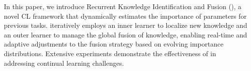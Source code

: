 


In this paper, we introduce Recurrent Knowledge Identification and Fusion ({\ouralg}), a novel CL framework that dynamically estimates the importance of parameters for previous tasks. {\ouralg} iteratively employs an inner learner to localize new knowledge and an outer learner to manage the global fusion of knowledge, enabling real-time and adaptive adjustments to the fusion strategy based on evolving importance distributions. Extensive experiments demonstrate the effectiveness of {\ouralg} in addressing continual learning challenges.


